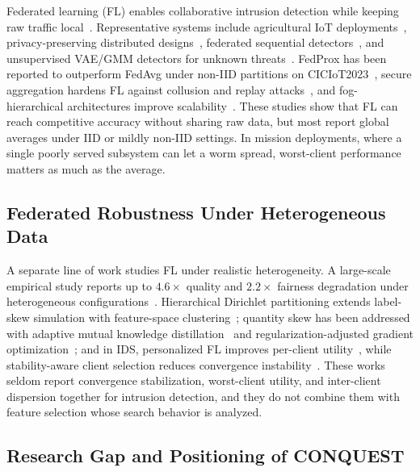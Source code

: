\documentclass[conference]{IEEEtran}
\begin{document}
Federated learning (FL) enables collaborative intrusion detection
while keeping raw traffic local~\cite{hamadsystematic}.
Representative systems include agricultural IoT
deployments~\cite{FRIHA202217}, privacy-preserving distributed
designs~\cite{amrosecuring}, federated sequential
detectors~\cite{selvamfederated,anweradvanced}, and unsupervised
VAE/GMM detectors for unknown threats~\cite{camposfederated}. FedProx
has been reported to outperform FedAvg under non-IID partitions on
CICIoT2023~\cite{herlambangfederated}, secure aggregation hardens FL
against collusion and replay attacks~\cite{yaoenhanced}, and
fog-hierarchical architectures improve
scalability~\cite{alsalehheterogeneity,islamprivacy}. These studies
show that FL can reach competitive accuracy without sharing raw data,
but most report global averages under IID or mildly non-IID settings.
In mission deployments, where a single poorly served subsystem can
let a worm spread, worst-client performance matters as much as the
average.

\subsection{Federated Robustness Under Heterogeneous Data}

A separate line of work studies FL under realistic heterogeneity. A
large-scale empirical study reports up to $4.6\times$ quality and
$2.2\times$ fairness degradation under heterogeneous
configurations~\cite{abdelmoniemcomprehensive}. Hierarchical
Dirichlet partitioning extends label-skew simulation with
feature-space clustering~\cite{arisdakessiantwo}; quantity skew has
been addressed with adaptive mutual knowledge
distillation~\cite{gefedamkd} and regularization-adjusted gradient
optimization~\cite{chaaddressing}; and in IDS, personalized FL
improves per-client utility~\cite{almansouradaptive}, while
stability-aware client selection reduces convergence
instability~\cite{vinothinienhancing}. These works seldom report
convergence stabilization, worst-client utility, and inter-client
dispersion together for intrusion detection, and they do not combine
them with feature selection whose search behavior is analyzed.

\subsection{Research Gap and Positioning of CONQUEST}
\end{document}
